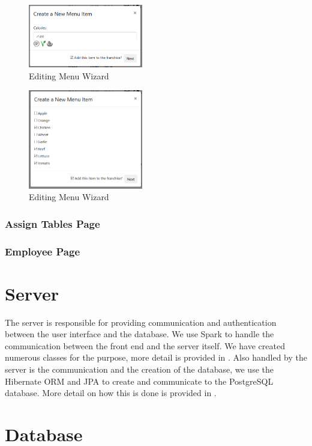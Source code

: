 \documentclass[12pt, twoside, a4paper]{report}
\begin{document}
\begin{figure}[H]
  \centering
  \includegraphics[width=5cm]{editWizard2.png}
  \caption{Editing Menu Wizard}
  \label{fig:editWizard2}
\end{figure}

\begin{figure}[H]
  \centering
  \includegraphics[width=5cm]{editWizard3.png}
  \caption{Editing Menu Wizard}
  \label{fig:editWizard3}
\end{figure}

\subsubsection*{Assign Tables Page}

\subsubsection*{Employee Page}

\section*{Server}
The server is responsible for providing communication and authentication between the user interface and the database.
We use Spark to handle the communication between the front end and the server itself. We have created numerous classes for the purpose, more detail is provided in \textit{}.
Also handled by the server is the communication and the creation of the database, we use the Hibernate ORM and JPA to create and communicate to the PostgreSQL database. More detail on how this is done is provided in \textit{}.

\section*{Database}
\end{document}
